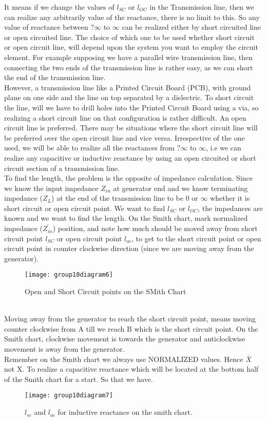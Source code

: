It means if we change the values of $ l_{SC} $ or $ l_{OC} $ in the Transmission line, then we can realize any arbitrarily value of the reactance, there is no limit to this. So any value of reactance between $ ?\infty$ to $\infty $ can be realized either by short circuited line or open circuited line. The choice of which one to be used whether short circuit or open circuit line, will depend upon the system you want to employ the circuit element.
For example supposing we have a parallel wire transmission line, then connecting the two ends of the transmission line is rather easy, as we can short the end of the transmission line.\\

However, a transmission line like a Printed Circuit Board (PCB), with ground plane on one side and the line on top separated by a dielectric. To short circuit the line, will we have to drill holes into the Printed Circuit Board using a via, so realizing a short circuit line on that configuration is rather difficult. An open circuit line is preferred. There may be situations where the short circuit line will be preferred over the open circuit line and vice versa. Irrespective of the one used, we will be able to realize all the reactances from  $ ?\infty$ to $\infty $, i.e we can realize any capacitive or inductive reactance by using an open circuited or short circuit section of a transmission line.\\

To find the length, the problem is the opposite of impedance calculation.  Since we know the input impedance $ Z_{in} $ at generator end  and we know terminating impedance ($ Z_{L} $) at the end of the transmission line to be 0 or $ \infty $ whether it is short circuit or open circuit point. We want to find $ l_{SC} $ or $ l_{OC} $, the impedances are known and we want to find the length.
On the Smith chart, mark normalized impedance ($ \overline{Z_{in}} $) position, and note how much should be moved away from short circuit point $ l_{SC} $ or open circuit point $ l_{oc} $, to get to the short circuit point or open circuit point in counter clockwise direction (since we are moving away from the generator).\\
\begin{figure}[h]
	\centering
	\texttt{[image: group10diagram6]}
	\caption{Open and Short Circuit points on the SMith Chart}
\end{figure} 
\\Moving away from the generator to reach the short circuit point, means moving counter clockwise from A till we reach B which is the short circuit point. On the Smith chart, clockwise movement is towards the generator and anticlockwise movement is away from the generator.\\Remember on the Smith chart we always use NORMALIZED values. Hence $ \overline{X} $ not X. To realize a capacitive reactance which will be located at the bottom half of the Smith chart for a start.
So that we have.
\begin{figure}[h]
	\centering
	\texttt{[image: group10diagram7]}
	\caption{$ l_{sc} $ and $ l_{oc} $ for inductive reactance on the smith chart.}
\end{figure}

